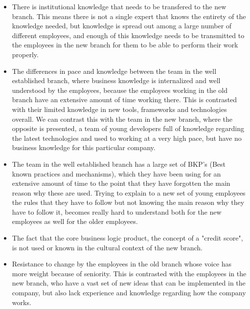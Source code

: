 \documentclass[12pt, letterpaper]{article}
\begin{document}
\begin{itemize}
  \item There is institutional knowledge that needs to be transfered to the new branch. This means there is not a single expert that 
  knows the entirety of the knowledge needed, but knowledge is spread out among a 
large number of different employees, and enough of this knowledge needs to be transmitted to the employees in the new 
branch for them to be able to perform their work properly.
  \item The differences in pace and knowledge between the team in the well established branch, where  
  business knowledge is internalized and well understood by the employees, because the employees working in the old branch have an extensive amount of time working there. This is contrasted with their limited knowledge in new tools, 
  frameworks and technologies overall. We can contrast this with the team in the new branch, where the opposite is
  presented, a team of young developers full of knowledge regarding the latest technologies and used to working at a 
  very high pace, but have no business knowledge for this particular company. 
  \item The team in the well established branch has a large set of BKP's (Best known practices and mechanisms), 
  which they have been using for an extensive amount of time to the point that they have forgotten the main reason
  why these are used. Trying to explain to a new set of young employees the rules that they have to follow but not
  knowing the main reason why they have to follow it, becomes really hard to understand both for the new employees
  as well for the older employees.
  \item The fact that the core business logic product, the concept of a "credit score", is not used or known in the 
cultural context of the new branch.
  \item Resistance to change by the employees in the old branch whose voice has more weight
  because of seniority. This is contrasted with the employees in the new branch, who have a vast set of new ideas 
  that can be implemented in the company, but also lack experience and knowledge regarding how the company works.
  
\end{itemize}
\end{document}
